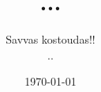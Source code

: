 \documentclass{book}
\begin{document}
\title{...}
\author{Savvas kostoudas!!\begin{figure}..\end{figure}}
\date{\today}

\frontmatter


\mainmatter


\backmatter
\end{document}

